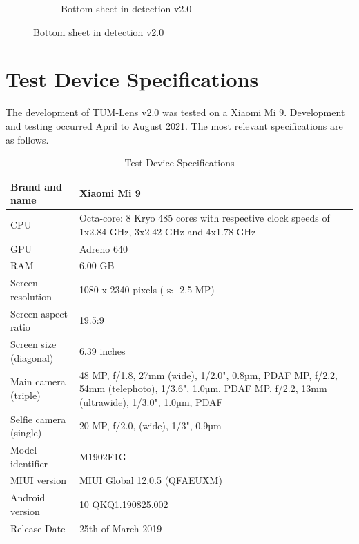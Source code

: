\documentclass[
			   fontsize=11pt,
               paper=a4,
               bibliography=totoc,
               idxtotoc,
               headsepline,
               footsepline,
               footinclude=false,
               BCOR=12mm,
               DIV=13,
               openany,   %
               ]
               {scrbook}
\begin{document}
\begin{figure}[H]
\begin{subfigure}{.23\textwidth}
		\caption[Screenshots of the new app in version 2.0 showing the detection activity with its bottom sheet expanded]{Bottom sheet in detection v2.0}
		\label{fig:appImage23}
	\end{subfigure}
\end{figure}


\chapter{Test Device Specifications} \label{chap:specs}

The development of TUM-Lens v2.0 was tested on a Xiaomi Mi 9. Development and testing occurred April to August 2021. The most relevant specifications are as follows. 

\begin{table}[h]
	\begin{tabularx}{\columnwidth}
		{ >{\RaggedRight}p{4cm} | L }
		\hline
		Brand and name	&	Xiaomi Mi 9	\\	\hline
		CPU	&	Octa-core: 8 Kryo 485 cores with respective clock speeds of 1x2.84 GHz, 3x2.42 GHz and 4x1.78 GHz	\\	\hline
		GPU	&	Adreno 640	\\	\hline
		RAM	&	6.00 GB	\\	\hline
		Screen resolution	&	1080 x 2340 pixels ($\approx$ 2.5 MP)	\\	\hline
		Screen aspect ratio	&	19.5:9 \\ \hline
		Screen size (diagonal)	&	6.39 inches	\\	\hline
		Main camera (triple)	&	48 MP, f/1.8, 27mm (wide), 1/2.0", 0.8µm, PDAF  MP, f/2.2, 54mm (telephoto), 1/3.6", 1.0µm, PDAF  MP, f/2.2, 13mm (ultrawide), 1/3.0", 1.0µm, PDAF	\\	\hline
		Selfie camera (single)	& 20 MP, f/2.0, (wide), 1/3", 0.9µm \\ \hline
		Model identifier	&	M1902F1G	\\	\hline
		MIUI version	&	MIUI Global 12.0.5 (QFAEUXM)	\\	\hline
		Android version	&	10 QKQ1.190825.002	\\	\hline
		Release Date	&	25th of March 2019	\\	\hline
	\end{tabularx}
	\caption[Test Device Specifications]{Test Device Specifications}
	\label{tab:specs}
\end{table}


\listoffigures

\listoftables

\printbibliography

\printglossary[type=acronym,nonumberlist]

\printglossary[type=main,nonumberlist]
\end{document}
